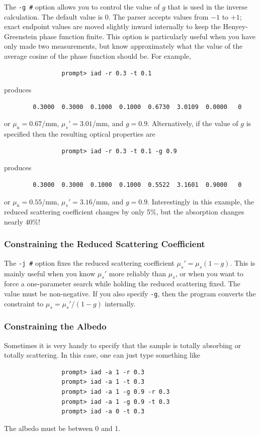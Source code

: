 \documentclass{article}
\begin{document}
The \texttt{-g \#} option allows you to control the value of $g$ that is used in the inverse
calculation.  The default value is 0.  The parser accepts values from $-1$ to
$+1$; exact endpoint values are moved slightly inward internally to keep the
Henyey-Greenstein phase function finite.  This option is particularly useful when you have only made two measurements,
but know approximately what the value of the average cosine of the phase function 
should be.  For example,
\begin{verbatim}
                prompt> iad -r 0.3 -t 0.1
\end{verbatim}
produces
\begin{verbatim}
        0.3000  0.3000  0.1000  0.1000  0.6730  3.0109  0.0000   0
\end{verbatim}
or $\mu_a=0.67$/mm, $\mu_s'=3.01$/mm, and $g=0.9$.  Alternatively, if the
value of $g$ is specified then the resulting optical properties are 
\begin{verbatim}
                prompt> iad -r 0.3 -t 0.1 -g 0.9
\end{verbatim}
produces
\begin{verbatim}
        0.3000  0.3000  0.1000  0.1000  0.5522  3.1601  0.9000   0
\end{verbatim}
or $\mu_a=0.55$/mm, $\mu_s'=3.16$/mm, and $g=0.9$.  Interestingly in this
example, the reduced scattering coefficient changes by only 5\%, but the
absorption changes nearly 40\%!

\subsubsection{Constraining the Reduced Scattering Coefficient}

The \texttt{-j \#} option fixes the reduced scattering coefficient
$\mu_s'=\mu_s(1-g)$.  This is mainly useful when you know $\mu_s'$ more
reliably than $\mu_s$, or when you want to force a one-parameter search while
holding the reduced scattering fixed.  The value must be non-negative.  If you also specify \texttt{-g}, then
the program converts the constraint to $\mu_s=\mu_s'/(1-g)$ internally.

\subsubsection{Constraining the Albedo}

Sometimes it is very handy to specify that the sample is totally absorbing
or totally scattering.  In this case, one can just type something like
\begin{verbatim}
                prompt> iad -a 1 -r 0.3
                prompt> iad -a 1 -t 0.3
                prompt> iad -a 1 -g 0.9 -r 0.3
                prompt> iad -a 1 -g 0.9 -t 0.3
                prompt> iad -a 0 -t 0.3
\end{verbatim}
The albedo must be between 0 and 1.
\end{document}
